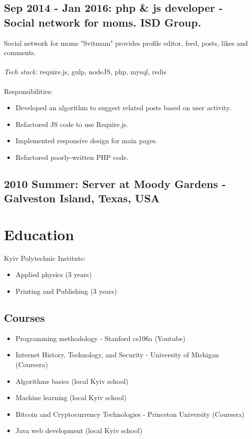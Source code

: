 \documentclass[a4paper, 14pt]{article}
\begin{document}
  \subsection{Sep 2014 - Jan 2016: php \& js developer - Social network for moms. ISD Group.}
    Social network for moms "Svitmam" provides profile editor, feed, posts, likes and comments. \\
  \\
  \textit{Tech stack:} require.js, gulp, nodeJS, php, mysql, redis \\
  \\
  Responsibilities:
  \begin{itemize}
    \item Developed an algorithm to suggest related posts based on user activity. \\
    \item Refactored JS code to use Require.js. \\
    \item Implemented responsive design for main pages. \\
    \item Refactored poorly-written PHP code.
  \end{itemize}

  \subsection{2010 Summer: Server at Moody Gardens - Galveston Island, Texas, USA}

\section{Education}
  Kyiv Polytechnic Institute: 
  \begin{itemize}
    \item Applied physics (3 years) \\
    \item Printing and Publishing (3 years)
  \end{itemize}

  \subsection{Courses}
  \begin{itemize}
    \item Programming methodology - Stanford cs106a (Youtube) \\
    \item Internet History, Technology, and Security - University of Michigan (Coursera) \\
    \item Algorithms basics (local Kyiv school) \\
    \item Machine learning (local Kyiv school) \\
    \item Bitcoin and Cryptocurrency Technologies - Princeton University (Coursera) \\
    \item Java web development (local Kyiv school)
  \end{itemize}
\end{document}

